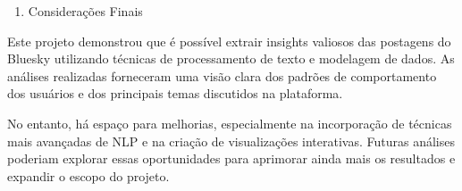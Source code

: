 \documentclass[
  letterpaper,
  DIV=11,
  numbers=noendperiod]{scrartcl}
\providecommand{\tightlist}{%
  \setlength{\itemsep}{0pt}\setlength{\parskip}{0pt}}\usepackage{longtable,booktabs,array}
\begin{document}
\begin{enumerate}
\def\labelenumi{\arabic{enumi}.}
\setcounter{enumi}{4}
\tightlist
\item
  Considerações Finais
\end{enumerate}

Este projeto demonstrou que é possível extrair insights valiosos das
postagens do Bluesky utilizando técnicas de processamento de texto e
modelagem de dados. As análises realizadas forneceram uma visão clara
dos padrões de comportamento dos usuários e dos principais temas
discutidos na plataforma.

No entanto, há espaço para melhorias, especialmente na incorporação de
técnicas mais avançadas de NLP e na criação de visualizações
interativas. Futuras análises poderiam explorar essas oportunidades para
aprimorar ainda mais os resultados e expandir o escopo do projeto.
\end{document}

